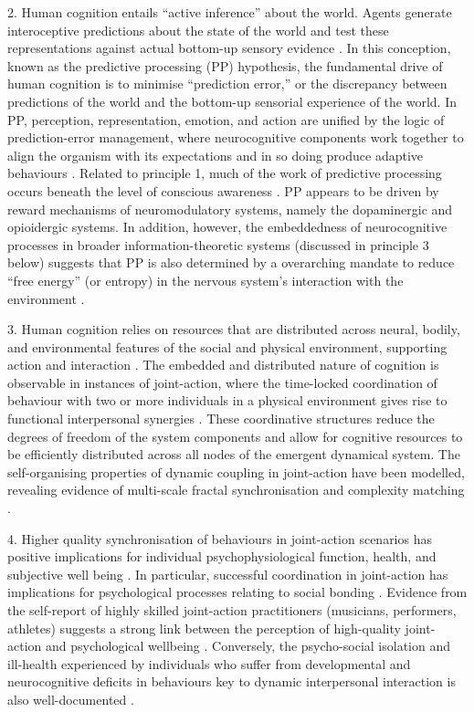 2. Human cognition entails ``active inference'' \citep{Friston2010} about the world. Agents generate interoceptive predictions about the state of the world and test these representations against actual bottom-up sensory evidence \citep{Clark2013}.  In this conception, known as the predictive processing (PP) hypothesis, the fundamental drive of human cognition is to minimise ``prediction error,'' or the discrepancy between predictions of the world and the bottom-up sensorial experience of the world. In PP, perception, representation, emotion, and action are unified by the logic of prediction-error management, where neurocognitive components work together to align the organism with its expectations and in so doing produce adaptive behaviours \citep{Pezzulo2014}. Related to principle 1, much of the work of predictive processing occurs beneath the level of conscious awareness \citep{Frith2007,Clark2013}.
PP appears to be driven by reward mechanisms of neuromodulatory systems, namely the dopaminergic \citep{Schultz2016} and opioidergic \citep{Laurent2014} systems.  In addition, however, the embeddedness of neurocognitive processes in broader information-theoretic systems (discussed in principle 3 below) suggests that PP is also determined by a overarching mandate to reduce ``free energy'' (or entropy) in the nervous system's interaction with the environment \citep{Friston2010}.

3. Human cognition relies on resources that are distributed across neural, bodily, and environmental features of the social and physical environment, supporting action and interaction \citep{Hutchins1995,Kirsh1995,Smith2004}.  The embedded and distributed nature of cognition is observable in instances of joint-action, where the time-locked coordination of behaviour with two or more individuals in a physical environment gives rise to functional interpersonal synergies \citep{Riley2011,Coey2012}.  These coordinative structures reduce the degrees of freedom of the system components and allow for cognitive resources to be efficiently distributed across all nodes of the emergent dynamical system. The self-organising properties of dynamic coupling in joint-action have been modelled, revealing evidence of multi-scale fractal synchronisation and complexity matching \citep{Schmidt2011,Richardson2012}.

4. Higher quality synchronisation of behaviours in joint-action scenarios has positive implications for individual psychophysiological function, health, and subjective well being \citep{Wheatley2012}.  In particular, successful coordination in joint-action has implications for psychological processes relating to social bonding \citep{Marsh2009,Launay2016}.  Evidence from the self-report of highly skilled joint-action practitioners (musicians, performers, athletes) suggests a strong link between the perception of high-quality joint-action and psychological wellbeing \citep{Jackson1995,Jackson1992}.  Conversely, the psycho-social isolation and ill-health experienced by individuals who suffer from developmental and neurocognitive deficits in behaviours key to dynamic interpersonal interaction is also well-documented \citep[e.g.][]{Blakemore2005,Baron-Cohen1991}.

